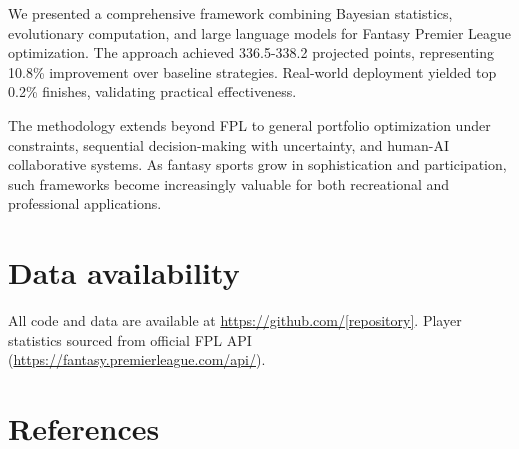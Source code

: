 \documentclass[10pt,a4paper]{article}
\begin{document}
We presented a comprehensive framework combining Bayesian statistics, evolutionary computation, and large language models for Fantasy Premier League optimization. The approach achieved 336.5-338.2 projected points, representing 10.8\% improvement over baseline strategies. Real-world deployment yielded top 0.2\% finishes, validating practical effectiveness.

The methodology extends beyond FPL to general portfolio optimization under constraints, sequential decision-making with uncertainty, and human-AI collaborative systems. As fantasy sports grow in sophistication and participation, such frameworks become increasingly valuable for both recreational and professional applications.

\section*{Data availability}

All code and data are available at \url{https://github.com/[repository]}. Player statistics sourced from official FPL API (\url{https://fantasy.premierleague.com/api/}).

\section*{References}
\end{document}
